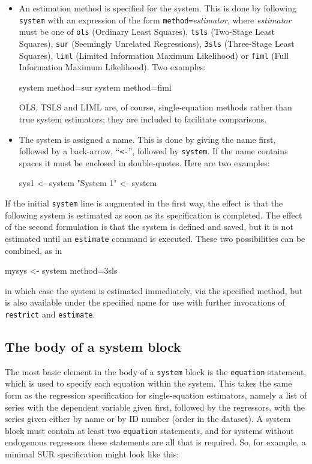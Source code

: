 \begin{itemize}
\item An estimation method is specified for the system. This is done
  by following \texttt{system} with an expression of the form
  \texttt{method=}\textsl{estimator}, where \textsl{estimator} must be
  one of \texttt{ols} (Ordinary Least Squares), \texttt{tsls}
  (Two-Stage Least Squares), \texttt{sur} (Seemingly Unrelated
  Regressions), \texttt{3sls} (Three-Stage Least Squares),
  \texttt{liml} (Limited Information Maximum Likelihood) or
  \texttt{fiml} (Full Information Maximum Likelihood). Two examples:
\begin{code}
system method=sur
system method=fiml
\end{code}
OLS, TSLS and LIML are, of course, single-equation methods rather than
true system estimators; they are included to facilitate comparisons.
\item The system is assigned a name. This is done by giving the name
  first, followed by a back-arrow, ``\verb|<-|'', followed by
  \texttt{system}.  If the name contains spaces it must be enclosed in
  double-quotes. Here are two examples:
\begin{code}
sys1 <- system
"System 1" <- system
\end{code}
\end{itemize}

If the initial \texttt{system} line is augmented in the first way, the
effect is that the following system is estimated as soon as its
specification is completed. The effect of the second formulation is
that the system is defined and saved, but it is not estimated until an
\texttt{estimate} command is executed. These two possibilities can be
combined, as in
\begin{code}
mysys <- system method=3sls
\end{code}
in which case the system is estimated immediately, via the specified
method, but is also available under the specified name for use with
further invocations of \texttt{restrict} and \texttt{estimate}.

\subsection{The body of a system block}

The most basic element in the body of a \texttt{system} block is the
\texttt{equation} statement, which is used to specify each equation
within the system. This takes the same form as the regression
specification for single-equation estimators, namely a list of series
with the dependent variable given first, followed by the regressors,
with the series given either by name or by ID number (order in the
dataset). A system block must contain at least two \texttt{equation}
statements, and for systems without endogenous regressors these
statements are all that is required. So, for example, a minimal
SUR specification might look like this:

